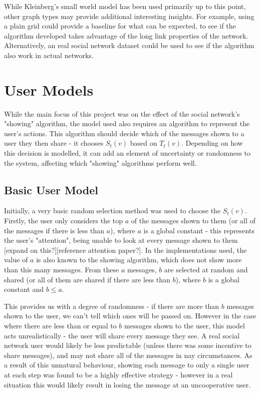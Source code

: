 \documentclass[bsc,frontabs,twoside,singlespacing,parskip,deptreport]{infthesis}     %
\begin{document}
While Kleinberg's small world model has been used primarily up to this point, other graph types may provide additional interesting insights. For example, using a plain grid could provide a baseline for what can be expected, to see if the algorithm developed takes advantage of the long link properties of the network. Alternatively, an real social network dataset could be used to see if the algorithm also work in actual networks.

\section{User Models}
While the main focus of this project was on the effect of the social network's "showing" algorithm, the model used also requires an algorithm to represent the user's actions. This algorithm should decide which of the messages shown to a user they then share - it chooses $S_{t}(v)$ based on $T_{t}(v)$. Depending on how this decision is modelled, it can add an element of uncertainty or randomness to the system, affecting which "showing" algorithms perform well.

\subsection{Basic User Model}
Initially, a very basic random selection method was used to choose the $S_{t}(v)$. Firstly, the user only considers the top $a$ of the messages shown to them (or all of the messages if there is less than $a$), where $a$ is a global constant - this represents the user's "attention", being unable to look at every message shown to them [expand on this?][reference attention paper?]. In the implementations used, the value of $a$ is also known to the showing algorithm, which does not show more than this many messages. From these $a$ messages, $b$ are selected at random and shared (or all of them are shared if there are less than $b$), where $b$ is a global constant and $b \le a$.

This provides us with a degree of randomness - if there are more than $b$ messages shown to the user, we can't tell which ones will be passed on. However in the case where there are less than or equal to $b$ messages shown to the user, this model acts unrealistically - the user will share every message they see. A real social network user would likely be less predictable (unless there was some incentive to share messages), and may not share all of the messages in nay circumstances. As a result of this unnatural behaviour, showing each message to only a single user at each step was found to be a highly effective strategy - however in a real situation this would likely result in losing the message at an uncooperative user.
\end{document}
